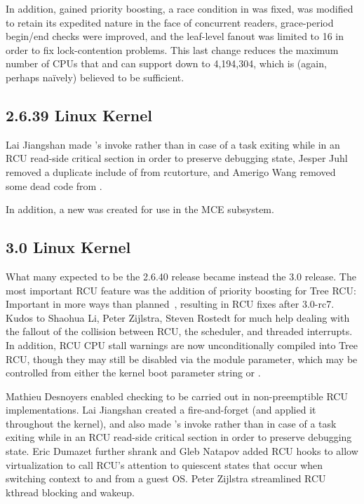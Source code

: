 In addition,  gained priority boosting, a race condition
in  was fixed,
 was modified to retain its expedited
nature in the face of concurrent readers,
grace-period begin/end checks were improved,
and the  leaf-level fanout was limited to 16 in order to fix
lock-contention problems.
This last change reduces the maximum number of CPUs that 
and  can support down to 4,194,304, which is
(again, perhaps na\"ively) believed to be sufficient.

\subsection{2.6.39 Linux Kernel}

Lai Jiangshan made 's  invoke
rather than  in case of a task exiting while
in an RCU read-side critical section in order to preserve debugging
state,
Jesper Juhl removed a duplicate include of  from
rcutorture,
and
Amerigo Wang removed some dead code from .

In addition, a new  was created for use in the
MCE subsystem.

\subsection{3.0 Linux Kernel}

What many expected to be the 2.6.40 release became instead the 3.0 release.
The most important RCU feature was the addition of priority boosting
for Tree RCU: Important in more ways than
planned~\cite{PaulEMcKenney2011RCU3.0trainwreck}, resulting in RCU
fixes after 3.0-rc7.
Kudos to Shaohua Li, Peter Zijlstra, Steven Rostedt for much help
dealing with the fallout of the collision between RCU, the scheduler,
and threaded interrupts.
In addition, RCU CPU stall warnings are now unconditionally compiled
into Tree RCU, though they may still be disabled via the
 module parameter, which may be controlled
from either the kernel boot parameter string or .

Mathieu Desnoyers enabled  checking to
be carried out in non-preemptible RCU implementations.
Lai Jiangshan created a fire-and-forget  (and applied
it throughout the kernel),
and also made 's  invoke
rather than  in case of a task exiting while
in an RCU read-side critical section in order to preserve debugging
state.
Eric Dumazet further shrank  and
Gleb Natapov added RCU hooks to allow virtualization to call RCU's
attention to quiescent states that occur when switching context to
and from a guest OS.
Peter Zijlstra streamlined RCU kthread blocking and wakeup.

